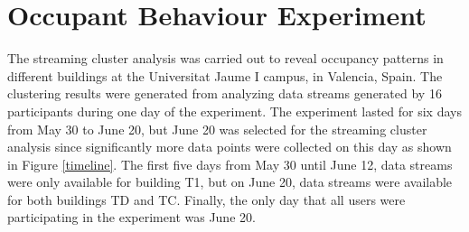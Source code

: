 




\newpage
\section{Occupant Behaviour Experiment}
The streaming cluster analysis was carried out to reveal occupancy patterns in different buildings at the Universitat Jaume I campus, in Valencia, Spain. The clustering results were generated from analyzing data streams generated by 16 participants during one day of the experiment. The experiment lasted for six days from May 30 to June 20, but June 20 was selected for the streaming cluster analysis since significantly more data points were collected on this day as shown in Figure \ref{timeline}. The first five days from May 30 until June 12, data streams were only available for building T1, but on June 20, data streams were available for both buildings TD and TC. Finally, the only day that all users were participating in the experiment was June 20.

